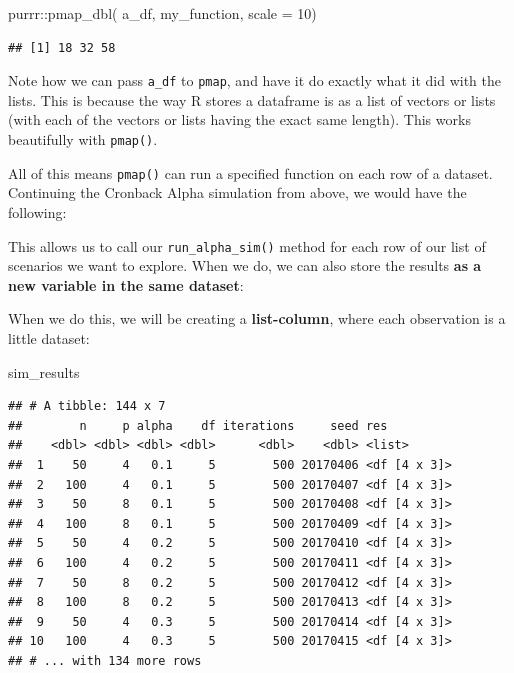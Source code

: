 \documentclass[
]{book}
\newenvironment{Shaded}{\begin{snugshade}}{\end{snugshade}}
\newcommand{\AttributeTok}[1]{\textcolor[rgb]{0.77,0.63,0.00}{#1}}
\newcommand{\DecValTok}[1]{\textcolor[rgb]{0.00,0.00,0.81}{#1}}
\newcommand{\FunctionTok}[1]{\textcolor[rgb]{0.00,0.00,0.00}{#1}}
\newcommand{\NormalTok}[1]{#1}
\newcommand{\OtherTok}[1]{\textcolor[rgb]{0.56,0.35,0.01}{#1}}
\newcommand{\SpecialCharTok}[1]{\textcolor[rgb]{0.00,0.00,0.00}{#1}}
\begin{document}
\begin{Shaded}
\begin{Highlighting}[]
\NormalTok{purrr}\SpecialCharTok{::}\FunctionTok{pmap\_dbl}\NormalTok{( a\_df, my\_function, }\AttributeTok{scale =} \DecValTok{10}\NormalTok{)}
\end{Highlighting}
\end{Shaded}

\begin{verbatim}
## [1] 18 32 58
\end{verbatim}

Note how we can pass \texttt{a\_df} to \texttt{pmap}, and have it do exactly what it did with the lists.
This is because the way R stores a dataframe is as a list of vectors or lists (with each of the vectors or lists having the exact same length). This works beautifully with \texttt{pmap()}.

All of this means \texttt{pmap()} can run a specified function on each row of a dataset.
Continuing the Cronback Alpha simulation from above, we would have the following:

This allows us to call our \texttt{run\_alpha\_sim()} method for each row of our list of scenarios we want to explore.
When we do, we can also store the results \textbf{as a new variable in the same dataset}:

\begin{Shaded}
\end{Shaded}

When we do this, we will be creating a \textbf{list-column}, where each observation is a little dataset:

\begin{Shaded}
\begin{Highlighting}[]
\NormalTok{sim\_results}
\end{Highlighting}
\end{Shaded}

\begin{verbatim}
## # A tibble: 144 x 7
##        n     p alpha    df iterations     seed res         
##    <dbl> <dbl> <dbl> <dbl>      <dbl>    <dbl> <list>      
##  1    50     4   0.1     5        500 20170406 <df [4 x 3]>
##  2   100     4   0.1     5        500 20170407 <df [4 x 3]>
##  3    50     8   0.1     5        500 20170408 <df [4 x 3]>
##  4   100     8   0.1     5        500 20170409 <df [4 x 3]>
##  5    50     4   0.2     5        500 20170410 <df [4 x 3]>
##  6   100     4   0.2     5        500 20170411 <df [4 x 3]>
##  7    50     8   0.2     5        500 20170412 <df [4 x 3]>
##  8   100     8   0.2     5        500 20170413 <df [4 x 3]>
##  9    50     4   0.3     5        500 20170414 <df [4 x 3]>
## 10   100     4   0.3     5        500 20170415 <df [4 x 3]>
## # ... with 134 more rows
\end{verbatim}
\end{document}
